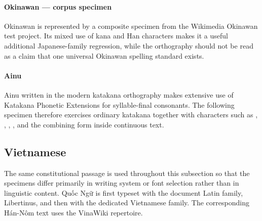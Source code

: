 \paragraph{Okinawan --- corpus specimen}

Okinawan is represented by a composite specimen from the Wikimedia Okinawan
test project. Its mixed use of kana and Han characters makes it a useful
additional Japanese-family regression, while the orthography should not be
read as a claim that one universal Okinawan spelling standard exists.


\paragraph{Ainu}

Ainu written in the modern katakana orthography makes extensive use of
Katakana Phonetic Extensions for syllable-final consonants. The following
specimen therefore exercises ordinary katakana together with characters such
as , , , , and the combining form  inside
continuous text.


\subsection{Vietnamese}

The same constitutional passage is used throughout this subsection so that
the specimens differ primarily in writing system or font selection rather
than in linguistic content. Quốc Ngữ is first typeset with the document Latin
family, Libertinus, and then with the dedicated Vietnamese family. The
corresponding Hán-Nôm text uses the VinaWiki repertoire.

